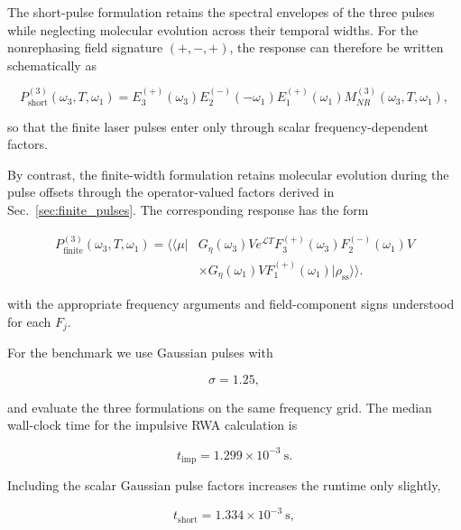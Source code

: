 \documentclass[11pt]{article}
\begin{document}
The short-pulse formulation retains the spectral envelopes of the
three pulses while neglecting molecular evolution across their
temporal widths.  For the nonrephasing field signature $(+,-,+)$, the
response can therefore be written schematically as

\begin{equation}
P_{\mathrm{short}}^{(3)}
(\omega_3,T,\omega_1)
=
E_3^{(+)}(\omega_3)
E_2^{(-)}(-\omega_1)
E_1^{(+)}(\omega_1)
M_{NR}^{(3)}
(\omega_3,T,\omega_1),
\end{equation}

so that the finite laser pulses enter only through scalar
frequency-dependent factors.

By contrast, the finite-width formulation retains molecular evolution
during the pulse offsets through the operator-valued factors derived
in Sec.~\ref{sec:finite_pulses}. The corresponding response has the
form

\begin{equation}
\begin{aligned}
P_{\mathrm{finite}}^{(3)}
(\omega_3,T,\omega_1)
=
\langle\!\langle\mu|
&G_\eta(\omega_3)
V
e^{\mathcal{L}T}
F_3^{(+)}(\omega_3)
F_2^{(-)}(\omega_1)
V
\\
&\times
G_\eta(\omega_1)
V
F_1^{(+)}(\omega_1)
|\rho_{\mathrm{ss}}\rangle\rangle .
\end{aligned}
\end{equation}

with the appropriate frequency arguments and field-component signs
understood for each $F_j$.

For the benchmark we use Gaussian pulses with

\begin{equation}
\sigma=1.25,
\end{equation}

and evaluate the three formulations on the same frequency grid.  The
median wall-clock time for the impulsive RWA calculation is

\begin{equation}
\boxed{
t_{\mathrm{imp}}
=
1.299\times10^{-3}\ \mathrm{s}.
}
\end{equation}

Including the scalar Gaussian pulse factors increases the runtime only
slightly,

\begin{equation}
\boxed{
t_{\mathrm{short}}
=
1.334\times10^{-3}\ \mathrm{s},
}
\end{equation}
\end{document}
